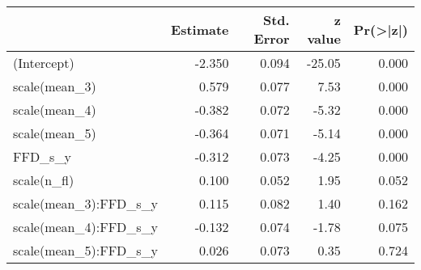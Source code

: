 \documentclass[
]{article}
\newenvironment{Shaded}{\begin{snugshade}}{\end{snugshade}}
\newcommand{\DataTypeTok}[1]{\textcolor[rgb]{0.13,0.29,0.53}{#1}}
\newcommand{\DecValTok}[1]{\textcolor[rgb]{0.00,0.00,0.81}{#1}}
\newcommand{\KeywordTok}[1]{\textcolor[rgb]{0.13,0.29,0.53}{\textbf{#1}}}
\newcommand{\NormalTok}[1]{#1}
\newcommand{\OperatorTok}[1]{\textcolor[rgb]{0.81,0.36,0.00}{\textbf{#1}}}
\begin{document}
\begin{table}

\centering
\begin{tabular}[t]{l|r|r|r|r}
\hline
  & Estimate & Std. Error & z value & Pr(>|z|)\\
\hline
(Intercept) & -2.350 & 0.094 & -25.05 & 0.000\\
\hline
scale(mean\_3) & 0.579 & 0.077 & 7.53 & 0.000\\
\hline
scale(mean\_4) & -0.382 & 0.072 & -5.32 & 0.000\\
\hline
scale(mean\_5) & -0.364 & 0.071 & -5.14 & 0.000\\
\hline
FFD\_s\_y & -0.312 & 0.073 & -4.25 & 0.000\\
\hline
scale(n\_fl) & 0.100 & 0.052 & 1.95 & 0.052\\
\hline
scale(mean\_3):FFD\_s\_y & 0.115 & 0.082 & 1.40 & 0.162\\
\hline
scale(mean\_4):FFD\_s\_y & -0.132 & 0.074 & -1.78 & 0.075\\
\hline
scale(mean\_5):FFD\_s\_y & 0.026 & 0.073 & 0.35 & 0.724\\
\hline
\end{tabular}
\centering
\begin{tabular}[t]{}
\hline

\hline
\end{tabular}
\centering
\begin{tabular}[t]{}
\hline

\hline
\end{tabular}
\end{table}

\begin{Shaded}
\end{Shaded}
\end{document}
